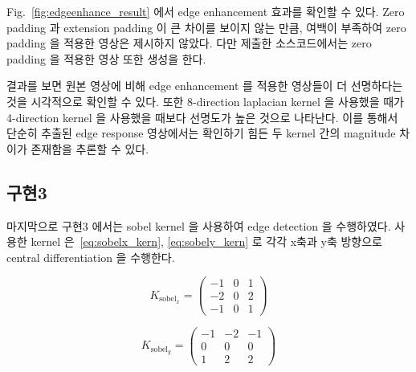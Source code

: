 \documentclass[a4paper, 12p]{paper}
\begin{document}
Fig.~\ref{fig:edgeenhance_result} 에서 edge enhancement 효과를 확인할 수 있다. Zero padding 과 extension padding 이 큰 차이를 보이지 않는 만큼, 여백이 부족하여 zero padding 을 적용한 영상은 제시하지 않았다. 다만 제출한 소스코드에서는 zero padding 을 적용한 영상 또한 생성을 한다.

결과를 보면 원본 영상에 비해 edge enhancement 를 적용한 영상들이 더 선명하다는 것을 시각적으로 확인할 수 있다. 또한 8-direction laplacian kernel 을 사용했을 때가 4-direction kernel 을 사용했을 때보다 선명도가 높은 것으로 나타난다. 이를 통해서 단순히 추출된 edge response 영상에서는 확인하기 힘든 두 kernel 간의 magnitude 차이가 존재함을 추론할 수 있다.

\subsection{구현3}
마지막으로 구현3 에서는 sobel kernel 을 사용하여 edge detection 을 수행하였다. 사용한 kernel 은~\ref{eq:sobelx_kern}, \ref{eq:sobely_kern} 로 각각 x축과 y축 방향으로 central differentiation 을 수행한다.

\begin{equation}
  K_{\text{sobel}_x} =
  \begin{pmatrix}
     -1  & 0 & 1 \\
     -2  & 0 & 2 \\
     -1  & 0 & 1 
  \end{pmatrix}\label{eq:sobelx_kern}
\end{equation}

\begin{equation}
  K_{\text{sobel}_y} =
  \begin{pmatrix}
     -1  & -2 & -1 \\
      0  &  0 &  0 \\
      1  &  2 &  2 
  \end{pmatrix}\label{eq:sobely_kern}
\end{equation}
\end{document}
